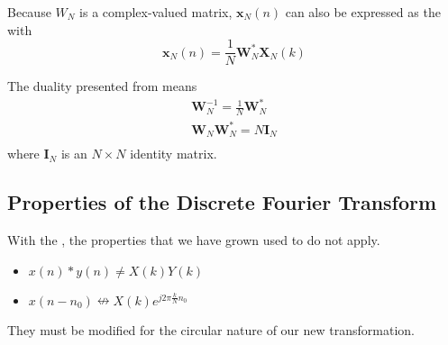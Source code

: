 Because $W_{N}$ is a complex-valued matrix, $\mathbf{x}_{N}(n)$ can also be expressed as the  with 
\begin{equation}\label{eq:IDFT_Matrix_Complex_Conjugate}
  \mathbf{x}_{N}(n) = \frac{1}{N} \mathbf{W}_{N}^{*} \mathbf{X}_{N}(k)
\end{equation}

The duality presented from  means
\begin{equation}\label{eq:DFT_W_Matrix_Unitary}
  \begin{aligned}
    \mathbf{W}_{N}^{-1} = \frac{1}{N} \mathbf{W}_{N}^{*} \\
    \mathbf{W}_{N} \mathbf{W}_{N}^{*} = N \mathbf{I}_{N} \\
  \end{aligned}
\end{equation}
where $\mathbf{I}_{N}$ is an $N \times N$ identity matrix.

\subsection{Properties of the Discrete Fourier Transform}\label{subsec:DFT_Properties}
With the , the properties that we have grown used to do not apply.
\begin{itemize}[noitemsep]
\item $x(n) * y(n) \neq X(k)Y(k)$
\item $x(n-n_{0}) \nleftrightarrow X(k) e^{j 2\pi \frac{k}{N} n_{0}}$
\end{itemize}
They must be modified for the circular nature of our new transformation.


